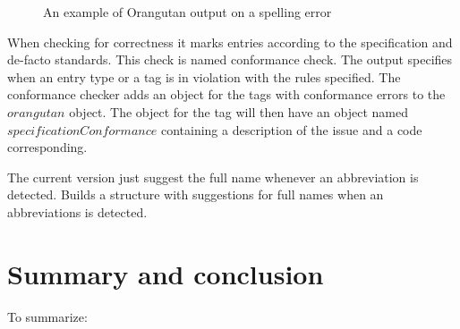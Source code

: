 \begin{figure}
  \centering
\begin{verbatim}
\end{verbatim}
\caption{An example of Orangutan output on a spelling error}
\label{fig:orgazing_misspelling_output}
\end{figure}


When checking for correctness it marks entries according to the
{\bibtex} specification and de-facto standards.  This check is named
conformance check.  The output specifies when an entry type or a tag
is in violation with the rules specified.  The conformance checker
adds an object for the tags with conformance errors to the $orangutan$
object.  The object for the tag will then have an object named
$specificationConformance$ containing a description of the issue and a
code corresponding.

The current version just suggest the full name whenever an
abbreviation is detected.  Builds a structure with suggestions for
full names when an abbreviations is detected.

\section{Summary and conclusion}

To summarize:
